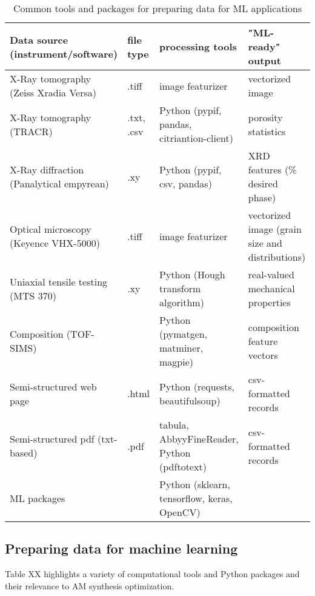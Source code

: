 \begin{table*}
\begin{tabular}{p{2.25cm}|p{2.25cm}|p{3cm}|p{4cm}|p{4cm}}
\end{tabular}
\end{table*}


\begin{table*}
    \renewcommand{\arraystretch}{0.8}
    \setlength{\tabcolsep}{5pt}
    \begin{center}
        \begin{tabular}{@{}llll@{}}
            \toprule
            Data source (instrument/software) & file type & processing tools & "ML-ready" output \\ \midrule
            \hline
            \hline
            X-Ray tomography (Zeiss Xradia Versa) & .tiff & image featurizer & vectorized image \\
            X-Ray tomography (TRACR) & .txt, .csv & Python (pypif, pandas, citriantion-client) & porosity statistics \\
            X-Ray diffraction (Panalytical empyrean) & .xy & Python (pypif, csv, pandas) & XRD features (\% desired phase) \\
            Optical microscopy (Keyence VHX-5000) & .tiff & image featurizer & vectorized image (grain size and distributions) \\
            Uniaxial tensile testing (MTS 370) & .xy & Python (Hough transform algorithm) & real-valued mechanical properties \\
            Composition (TOF-SIMS) & & Python (pymatgen, matminer, magpie) & composition feature vectors \\
            Semi-structured web page & .html & Python (requests, beautifulsoup) & csv-formatted records \\
            Semi-structured pdf (txt-based) & .pdf & tabula, AbbyyFineReader, Python (pdftotext) & csv-formatted records \\
            ML packages & & Python (sklearn, tensorflow, keras, OpenCV) & \\
            \hline
            \bottomrule
        \end{tabular}
        \caption{Common tools and packages for preparing data for ML applications}
        \label{table:data_tools}
    \end{center}
\end{table*}


\subsection{Preparing data for machine learning}
Table XX highlights a variety of computational tools and Python packages and their relevance to AM synthesis optimization.


